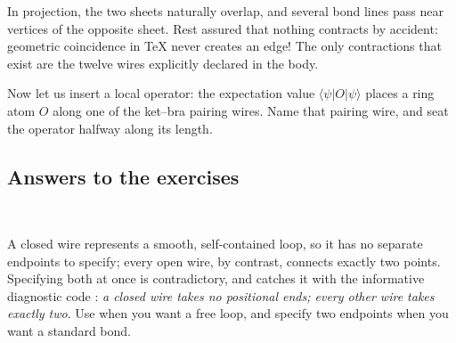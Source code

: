 \dbendpar In projection, the two sheets naturally overlap, and several bond
lines pass near vertices of the opposite sheet.  Rest assured that nothing
contracts by accident: geometric coincidence in \TeX{} never creates an edge!
The only contractions that exist are the twelve wires explicitly declared in
the body.

 Now let us insert a local operator: the
expectation value $\langle\psi\rvert O\lvert\psi\rangle$ places a ring atom $O$
along one of the ket--bra pairing wires.  Name that pairing wire, and seat the
operator halfway along its length.

\subsection{Answers to the exercises}

\begin{tnexample}[
  answer={ex:tut-matrix},
  formula={M_{\alpha\beta}},
  index={Two typed ports with no partners: the matrix keeps two open
    virtual indices and nothing else.},
  signature={kernel-boundary|signature=open:e, open:w}]
\begin{tenkz}[cols=1]
\end{tenkz}
\end{tnexample}

\begin{tnexample}[
  answer={ex:tut-transfer},
  formula={E=\sum_i A^i\otimes\overline{A^i}},
  index={The frame contracts the ket-bra physical pair; all four virtual
    ends stay open, so $E$ is a map on the doubled space.},
  signature={kernel-boundary|signature=open:e, open:e, open:w, open:w}]
\begin{tenkz}[rows={ket,bra}, cols=1, west=open, east=open]
   \\
\end{tenkz}
\end{tnexample}

 A closed wire represents a smooth, self-contained loop,
so it has no separate endpoints to specify; every open wire, by contrast,
connects exactly two points.  Specifying both at once is contradictory, and
\pkg{} catches it with the informative diagnostic code
: \emph{a closed wire takes no positional
ends; every other wire takes exactly two}.  Use  when you want a
free loop, and specify two endpoints when you want a standard bond.

